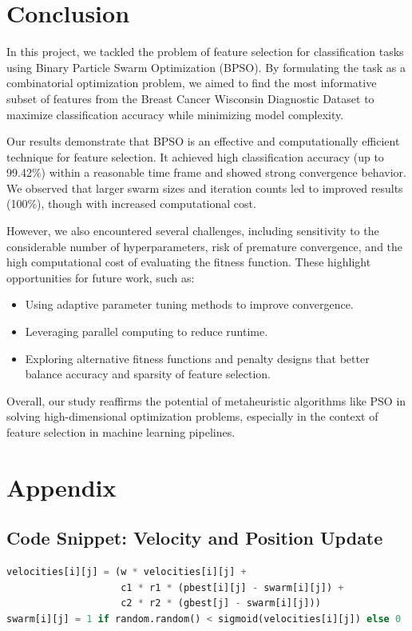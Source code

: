 \documentclass[12pt]{article}
\begin{document}
\section{Conclusion}
In this project, we tackled the problem of feature selection for classification tasks using Binary Particle Swarm Optimization (BPSO). By formulating the task as a combinatorial optimization problem, we aimed to find the most informative subset of features from the Breast Cancer Wisconsin Diagnostic Dataset to maximize classification accuracy while minimizing model complexity.

Our results demonstrate that BPSO is an effective and computationally efficient technique for feature selection. It achieved high classification accuracy (up to 99.42\%) within a reasonable time frame and showed strong convergence behavior. We observed that larger swarm sizes and iteration counts led to improved results (100\%), though with increased computational cost.

However, we also encountered several challenges, including sensitivity to the considerable number of hyperparameters, risk of premature convergence, and the high computational cost of evaluating the fitness function. These highlight opportunities for future work, such as:
\begin{itemize}
\item Using adaptive parameter tuning methods to improve convergence.
\item Leveraging parallel computing to reduce runtime.
\item Exploring alternative fitness functions and penalty designs that better balance accuracy and sparsity of feature selection.
\end{itemize}

Overall, our study reaffirms the potential of metaheuristic algorithms like PSO in solving high-dimensional optimization problems, especially in the context of feature selection in machine learning pipelines.

\newpage
\section*{Appendix}
\subsection*{Code Snippet: Velocity and Position Update}
\begin{lstlisting}[language=Python, basicstyle=\ttfamily\small]
velocities[i][j] = (w * velocities[i][j] +
                    c1 * r1 * (pbest[i][j] - swarm[i][j]) +
                    c2 * r2 * (gbest[j] - swarm[i][j]))
swarm[i][j] = 1 if random.random() < sigmoid(velocities[i][j]) else 0
\end{lstlisting}
\end{document}
